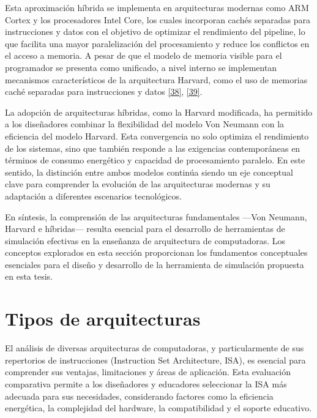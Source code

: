 \documentclass[12pt,oneside]{templates/unerthesis}
\begin{document}
Esta aproximación híbrida se implementa en arquitecturas modernas como ARM Cortex y los procesadores Intel Core, los cuales incorporan cachés separadas para instrucciones y datos con el objetivo de optimizar el rendimiento del pipeline, lo que facilita una mayor paralelización del procesamiento y reduce los conflictos en el acceso a memoria. A pesar de que el modelo de memoria visible para el programador se presenta como unificado, a nivel interno se implementan mecanismos característicos de la arquitectura Harvard, como el uso de memorias caché separadas para instrucciones y datos \protect\hyperlink{ref-arm2021architecture}{{[}38{]}}, \protect\hyperlink{ref-intel_microarchitecture_2021}{{[}39{]}}.

La adopción de arquitecturas híbridas, como la Harvard modificada, ha permitido a los diseñadores combinar la flexibilidad del modelo Von Neumann con la eficiencia del modelo Harvard. Esta convergencia no solo optimiza el rendimiento de los sistemas, sino que también responde a las exigencias contemporáneas en términos de consumo energético y capacidad de procesamiento paralelo. En este sentido, la distinción entre ambos modelos continúa siendo un eje conceptual clave para comprender la evolución de las arquitecturas modernas y su adaptación a diferentes escenarios tecnológicos.

En síntesis, la comprensión de las arquitecturas fundamentales ---Von Neumann, Harvard e híbridas--- resulta esencial para el desarrollo de herramientas de simulación efectivas en la enseñanza de arquitectura de computadoras. Los conceptos explorados en esta sección proporcionan los fundamentos conceptuales esenciales para el diseño y desarrollo de la herramienta de simulación propuesta en esta tesis.

\hypertarget{tipos-de-arquitecturas}{%
\section{Tipos de arquitecturas}\label{tipos-de-arquitecturas}}

El análisis de diversas arquitecturas de computadoras, y particularmente de sus repertorios de instrucciones (Instruction Set Architecture, ISA), es esencial para comprender sus ventajas, limitaciones y áreas de aplicación. Esta evaluación comparativa permite a los diseñadores y educadores seleccionar la ISA más adecuada para sus necesidades, considerando factores como la eficiencia energética, la complejidad del hardware, la compatibilidad y el soporte educativo.
\end{document}

